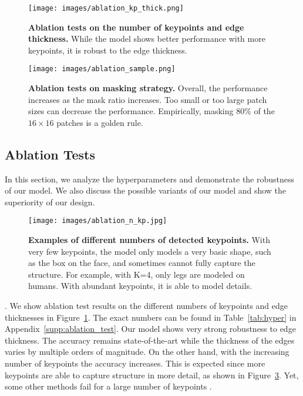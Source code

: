 \documentclass{article}
\begin{document}
\begin{figure}[t]
\begin{center}
  \texttt{[image: images/ablation\_kp\_thick.png]}
\end{center}
   \caption{\textbf{Ablation tests on the number of keypoints and edge thickness.} While the model shows better performance with more keypoints, it is robust to the edge thickness.}
\label{fig:ablation_kp_thick}
\end{figure}

\begin{figure}[t]
\begin{center}
  \texttt{[image: images/ablation\_sample.png]}
\end{center}
   \caption{\textbf{Ablation tests on masking strategy.} Overall, the performance increases as the mask ratio increases. Too small or too large patch sizes can decrease the performance. Empirically, masking 80\% of the $16\times16$ patches is a golden rule.}
\label{fig:ablation_masking}
\end{figure}

\subsection{Ablation Tests} \label{sec:ablation}



In this section, we analyze the hyperparameters and demonstrate the robustness of our model. We also discuss the possible variants of our model and show the superiority of our design. 

\begin{figure}[t]
\begin{center}
  \texttt{[image: images/ablation\_n\_kp.jpg]}
\end{center}
   \caption{\textbf{Examples of different numbers of detected keypoints.} With very few keypoints, the model only models a very basic shape, such as the box on the face, and sometimes cannot fully capture the structure. For example, with K=4, only legs are modeled on humans. With abundant keypoints, it is able to model details.}
\label{fig:ablation_kp}
\end{figure}



. 
We show ablation test results on the different numbers of keypoints and edge thicknesses in Figure~\ref{fig:ablation_kp_thick}. The exact numbers can be found in Table~\ref{tab:hyper} in Appendix~\ref{supp:ablation_test}. Our model shows very strong robustness to edge thickness. The accuracy remains state-of-the-art while the thickness of the edges varies by multiple orders of magnitude.
On the other hand, with the increasing number of keypoints the accuracy increases. This is expected since more keypoints are able to capture structure in more detail, as shown in Figure~\ref{fig:ablation_kp}. Yet, some other methods fail for a large number of keypoints \cite{he2022ganseg}.
\end{document}
